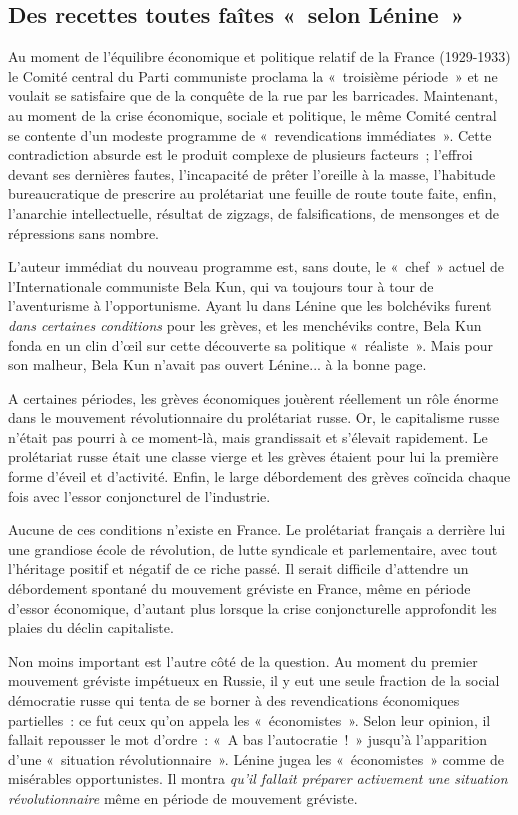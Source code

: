 \documentclass[french,twoside]{book} %
\begin{document}
\subsection[{Des recettes toutes faîtes « selon Lénine »}]{Des recettes toutes faîtes « selon Lénine »}
\noindent Au moment de l’équilibre économique et politique relatif de la France (1929-1933) le Comité central du Parti communiste proclama la « troisième période » et ne voulait se satisfaire que de la conquête de la rue par les barricades. Maintenant, au moment de la crise économique, sociale et politique, le même Comité central se contente d’un modeste programme de « revendications immédiates ». Cette contradiction absurde est le produit complexe de plusieurs facteurs ; l’effroi devant ses dernières fautes, l’incapacité de prêter l’oreille à la masse, l’habitude bureaucratique de prescrire au prolétariat une feuille de route toute faite, enfin, l’anarchie intellectuelle, résultat de zigzags, de falsifications, de mensonges et de répressions sans nombre.\par
L’auteur immédiat du nouveau programme est, sans doute, le « chef » actuel de l’Internationale communiste Bela Kun, qui va toujours tour à tour de l’aventurisme à l’opportunisme. Ayant lu dans Lénine que les bolchéviks furent \emph{dans certaines conditions} pour les grèves, et les menchéviks contre, Bela Kun fonda en un clin d’œil sur cette découverte sa politique « réaliste ». Mais pour son malheur, Bela Kun n’avait pas ouvert Lénine... à la bonne page.\par
A certaines périodes, les grèves économiques jouèrent réellement un rôle énorme dans le mouvement révolutionnaire du prolétariat russe. Or, le capitalisme russe n’était pas pourri à ce moment-là, mais grandissait et s’élevait rapidement. Le prolétariat russe était une classe vierge et  les grèves étaient pour lui la première forme d’éveil et d’activité. Enfin, le large débordement des grèves coïncida chaque fois avec l’essor conjoncturel de l’industrie.\par
Aucune de ces conditions n’existe en France. Le prolétariat français a derrière lui une grandiose école de révolution, de lutte syndicale et parlementaire, avec tout l’héritage positif et négatif de ce riche passé. Il serait difficile d’attendre un débordement spontané du mouvement gréviste en France, même en période d’essor économique, d’autant plus lorsque la crise conjoncturelle approfondit les plaies du déclin capitaliste.\par
Non moins important est l’autre côté de la question. Au moment du premier mouvement gréviste impétueux en Russie, il y eut une seule fraction de la social démocratie russe qui tenta de se borner à des revendications économiques partielles : ce fut ceux qu’on appela les « économistes ». Selon leur opinion, il fallait repousser le mot d’ordre : « A bas l’autocratie ! » jusqu’à l’apparition d’une « situation révolutionnaire ». Lénine jugea les « économistes » comme de misérables opportunistes. Il montra \emph{qu’il fallait préparer activement une situation révolutionnaire} même en période de mouvement gréviste.\par
\end{document}
